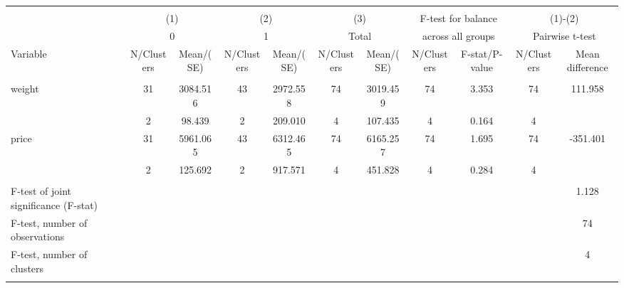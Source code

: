 
\begin{tabular}{@{\extracolsep{5pt}}lcccccccccc}
\\[-1.8ex]\hline \hline \\[-1.8ex]
 & \multicolumn{2}{c}{(1)}  & \multicolumn{2}{c}{(2)}  & \multicolumn{2}{c}{(3)}  & \multicolumn{2}{c}{F-test for balance} & \multicolumn{2}{c}{(1)-(2)} \\
 & \multicolumn{2}{c}{0}  & \multicolumn{2}{c}{1}  & \multicolumn{2}{c}{Total}  & \multicolumn{2}{c}{across all groups} & \multicolumn{2}{c}{Pairwise t-test}  \\
Variable & N/Clusters & Mean/(SE) & N/Clusters & Mean/(SE) & N/Clusters & Mean/(SE) & N/Clusters & F-stat/P-value & N/Clusters & Mean difference \\ \hline \\[-1.8ex] 
weight   & 31    &  3084.516    & 43    &  2972.558    & 74    &  3019.459    & 74    &     3.353    & 74    &   111.958   \\
 & 2  &    98.439  & 2  &   209.010  & 4  &   107.435  & 4  &     0.164  & 4  &   \\
price   & 31    &  5961.065    & 43    &  6312.465    & 74    &  6165.257    & 74    &     1.695    & 74    &  -351.401   \\
 & 2  &   125.692  & 2  &   917.571  & 4  &   451.828  & 4  &     0.284  & 4  &   \\
\hline \\[-1.8ex]
F-test of joint significance (F-stat) & &   & &   & &   & &     & &      1.128   \\
F-test, number of observations & &   & &   & &   & &   & &  74   \\
F-test, number of clusters & &   & &   & &   & &     & &  4   \\
\hline \\[-1.8ex]

\end{tabular}
